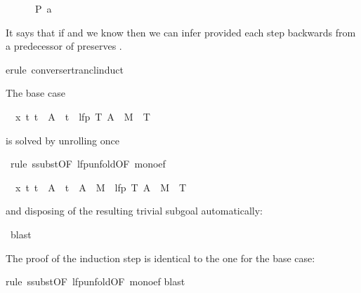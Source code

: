 \begin{isabellebody}
\begin{isamarkuptxt}
\begin{isabelle}
\ \ \ \ \ {\isasymLongrightarrow}\ P\ a%
\end{isabelle}
It says that if  and we know  then we can infer
 provided each step backwards from a predecessor  of
 preserves .%
\end{isamarkuptxt}%
erule\ converse{\isacharunderscore}rtrancl{\isacharunderscore}induct{\isacharparenright}%
\begin{isamarkuptxt}%
\noindent
The base case
\begin{isabelle}%
\ {}{\isachardot}\ {\isasymAnd}x\ t{\isachardot}\ t\ {\isasymin}\ A\ {\isasymLongrightarrow}\ t\ {\isasymin}\ lfp\ {\isacharparenleft}{\isasymlambda}T{\isachardot}\ A\ {\isasymunion}\ M{\isacharcircum}{\isacharminus}{}\ {\isacharcircum}{\isacharcircum}\ T{\isacharparenright}%
\end{isabelle}
is solved by unrolling  once%
\end{isamarkuptxt}%
\ rule\ ssubst{\isacharbrackleft}OF\ lfp{\isacharunderscore}unfold{\isacharbrackleft}OF\ mono{\isacharunderscore}ef{\isacharbrackright}{\isacharbrackright}{\isacharparenright}%
\begin{isamarkuptxt}%
\begin{isabelle}%
\ {}{\isachardot}\ {\isasymAnd}x\ t{\isachardot}\ t\ {\isasymin}\ A\ {\isasymLongrightarrow}\ t\ {\isasymin}\ A\ {\isasymunion}\ M{\isacharcircum}{\isacharminus}{}\ {\isacharcircum}{\isacharcircum}\ lfp\ {\isacharparenleft}{\isasymlambda}T{\isachardot}\ A\ {\isasymunion}\ M{\isacharcircum}{\isacharminus}{}\ {\isacharcircum}{\isacharcircum}\ T{\isacharparenright}%
\end{isabelle}
and disposing of the resulting trivial subgoal automatically:%
\end{isamarkuptxt}%
\ blast{\isacharparenright}%
\begin{isamarkuptxt}%
\noindent
The proof of the induction step is identical to the one for the base case:%
\end{isamarkuptxt}%
rule\ ssubst{\isacharbrackleft}OF\ lfp{\isacharunderscore}unfold{\isacharbrackleft}OF\ mono{\isacharunderscore}ef{\isacharbrackright}{\isacharbrackright}{\isacharparenright}\isanewline
{}blast{\isacharparenright}\isanewline

\end{isabellebody}
